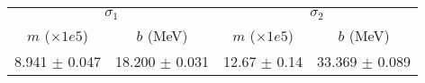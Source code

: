 \begin{tabular}{cc|cc}
\multicolumn{2}{c|}{$\sigma_1$} & \multicolumn{2}{|c}{$\sigma_2$} \\
$m$ ($\times1e5$) & $b$ (MeV) & $m$ ($\times1e5$) & $b$ (MeV) \\
\hline
8.941 $\pm$ 0.047 & 18.200 $\pm$ 0.031 & 12.67 $\pm$ 0.14 & 33.369 $\pm$ 0.089\\
\end{tabular}
